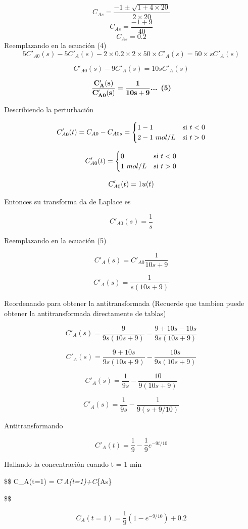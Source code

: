 \documentclass[
  letterpaper,
  DIV=11,
  numbers=noendperiod]{scrreprt}
\begin{document}
\[
C_{As}=\frac{-1±\sqrt{1+4\times 20}}{2\times 20}
\] \[
C_{As}=\frac{-1+9}{40}
\] \[
C_{As}=0.2
\] Reemplazando en la ecuación (4) \[
5C'_{A0}(s)-5C'_A(s)-2\times 0.2\times 2\times 50\times C'_A(s)=50\times sC'_A(s)
\]

\[
C'_{A0}(s)-9C'_A(s)=10 sC'_A(s)
\]

\[
\mathbf{\frac{C'_{A}(s)}{C'_{A0}(s)}=\frac{1}{10s+9}}\space\space\space\space\space\textbf{... (5)}
\]

Describiendo la perturbación

\[
C'_{A0}(t)=C_{A0}-C_{A0s}=
\begin{cases}
   1 - 1 &\text{si } t < 0 \\
   2 - 1 \space\ mol/L &\text{si } t>0\\
\end{cases}
\]

\[
C'_{A0}(t)=
\begin{cases}
   0 &\text{si } t < 0 \\
   1 \space\ mol/L &\text{si } t>0\\
\end{cases}
\]

\[
C'_{A0}(t)= 1\space u(t)
\]

Entonces su transforma da de Laplace es

\[
C'_{A0}(s)= \frac{1}{s}
\]

Reemplazando en la ecuación (5)

\[
C'_{A}(s)=C'_{A0}\frac{1}{10s+9}
\]

\[
C'_{A}(s)=\frac{1}{s(10s+9)}
\]

Reordenando para obtener la antitransformada (Recuerde que tambien puede
obtener la antitransformada directamente de tablas)

\[
C'_{A}(s)=\frac{9}{9s(10s+9)}=\frac{9+10s-10s}{9s(10s+9)}
\]

\[
C'_{A}(s)=\frac{9+10s}{9s(10s+9)}-\frac{10s}{9s(10s+9)}
\]

\[
C'_{A}(s)=\frac{1}{9s}-\frac{10}{9(10s+9)}
\]

\[
C'_{A}(s)=\frac{1}{9s}-\frac{1}{9(s+9/10)}
\]

Antitransformando

\[
C'_A(t) = \frac{1}{9}-\frac{1}{9}e^{-9t/10}
\]

Hallando la concentración cuando t = 1 min

\$\$ C\_A(t=1) = C'\emph{A(t=1)+C}\{As\}

\$\$

\[
C_A(t=1)=\frac{1}{9}(1-e^{-9/10})+0.2
\]
\end{document}
